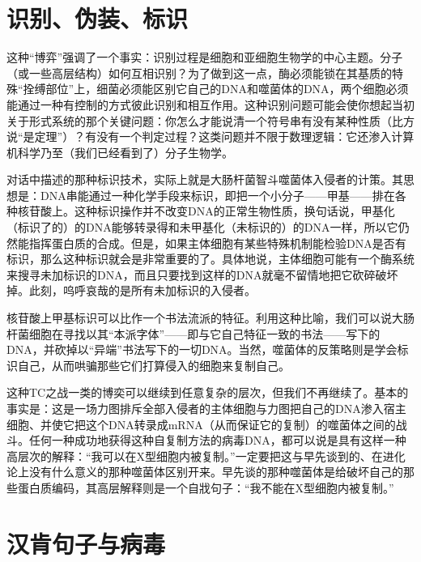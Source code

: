 \section{识别、伪装、标识}

这种“博弈”强调了一个事实：识别过程是细胞和亚细胞生物学的中心主题。分子（或一些高层结构）如何互相识别？为了做到这一点，酶必须能锁在其基质的特殊“拴缚部位”上，细菌必须能区别它自己的DNA和噬菌体的DNA，两个细胞必须能通过一种有控制的方式彼此识别和相互作用。这种识别问题可能会使你想起当初关于形式系统的那个关键问题：你怎么才能说清一个符号串有没有某种性质（比方说“是定理”）？有没有一个判定过程？这类问题并不限于数理逻辑：它还渗入计算机科学乃至（我们已经看到了）分子生物学。

对话中描述的那种标识技术，实际上就是大肠杆菌智斗噬菌体入侵者的计策。其思想是：DNA串能通过一种化学手段来标识，即把一个小分子——甲基——排在各种核苷酸上。这种标识操作并不改变DNA的正常生物性质，换句话说，甲基化（标识了的）的DNA能够转录得和未甲基化（未标识的）的DNA一样，所以它仍然能指挥蛋白质的合成。但是，如果主体细胞有某些特殊机制能检验DNA是否有标识，那么这种标识就会是非常重要的了。具体地说，主体细胞可能有一个酶系统来搜寻未加标识的DNA，而且只要找到这样的DNA就毫不留情地把它砍碎破坏掉。此刻，呜呼哀哉的是所有未加标识的入侵者。

核苷酸上甲基标识可以比作一个书法流派的特征。利用这种比喻，我们可以说大肠杆菌细胞在寻找以其“本派字体”——即与它自己特征一致的书法——写下的DNA，并砍掉以“异端”书法写下的一切DNA。当然，噬菌体的反策略则是学会标识自己，从而哄骗那些它们打算侵入的细胞来复制自己。

这种TC之战一类的博奕可以继续到任意复杂的层次，但我们不再继续了。基本的事实是：这是一场力图排斥全部入侵者的主体细胞与力图把自己的DNA渗入宿主细胞、并使它把这个DNA转录成mRNA（从而保证它的复制）的噬菌体之间的战斗。任何一种成功地获得这种自复制方法的病毒DNA，都可以说是具有这样一种高层次的解释：“我可以在X型细胞内被复制。”一定要把这与早先谈到的、在进化论上没有什么意义的那种噬菌体区别开来。早先谈的那种噬菌体是给破坏自己的那些蛋白质编码，其高层解释则是一个自戕句子：“我不能在X型细胞内被复制。”

\section{汉肯句子与病毒}

